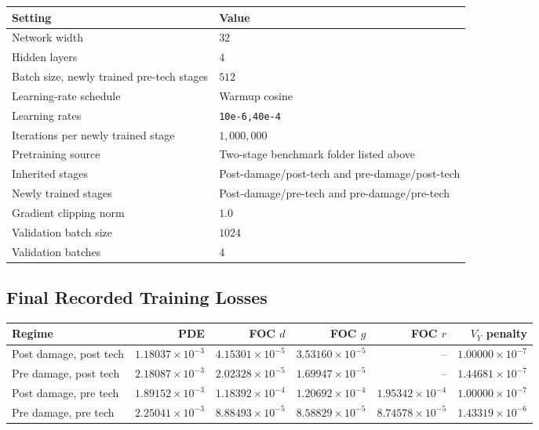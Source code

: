 \documentclass[11pt]{article}
\begin{document}
\begin{center}
\begin{tabular}{ll}
\toprule
Setting & Value \\
\midrule
Network width & $32$ \\
Hidden layers & $4$ \\
Batch size, newly trained pre-tech stages & $512$ \\
Learning-rate schedule & Warmup cosine \\
Learning rates & \texttt{10e-6,40e-4} \\
Iterations per newly trained stage & $1{,}000{,}000$ \\
Pretraining source & Two-stage benchmark folder listed above \\
Inherited stages & Post-damage/post-tech and pre-damage/post-tech \\
Newly trained stages & Post-damage/pre-tech and pre-damage/pre-tech \\
Gradient clipping norm & $1.0$ \\
Validation batch size & $1024$ \\
Validation batches & $4$ \\
\bottomrule
\end{tabular}
\end{center}

\subsection*{Final Recorded Training Losses}

\begin{center}
\begin{tabular}{lrrrrr}
\toprule
Regime & PDE & FOC $d$ & FOC $g$ & FOC $r$ & $V_Y$ penalty \\
\midrule
Post damage, post tech & $1.18037\times 10^{-3}$ & $4.15301\times 10^{-5}$ & $3.53160\times 10^{-5}$ & -- & $1.00000\times 10^{-7}$ \\
Pre damage, post tech & $2.18087\times 10^{-3}$ & $2.02328\times 10^{-5}$ & $1.69947\times 10^{-5}$ & -- & $1.44681\times 10^{-7}$ \\
Post damage, pre tech & $1.89152\times 10^{-3}$ & $1.18392\times 10^{-4}$ & $1.20692\times 10^{-4}$ & $1.95342\times 10^{-4}$ & $1.00000\times 10^{-7}$ \\
Pre damage, pre tech & $2.25041\times 10^{-3}$ & $8.88493\times 10^{-5}$ & $8.58829\times 10^{-5}$ & $8.74578\times 10^{-5}$ & $1.43319\times 10^{-6}$ \\
\bottomrule
\end{tabular}
\end{center}
\end{document}

